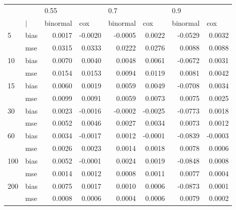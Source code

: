 \begin{table}[ht]
\centering
\begin{tabular}{ll rrrrrr}
  \toprule
     &            & \multicolumn{1}{l}{     0.55} & \multicolumn{1}{l}{        } & \multicolumn{1}{l}{      0.7} & \multicolumn{1}{l}{        } & \multicolumn{1}{l}{      0.9} & \multicolumn{1}{l}{        } \\ 
      &  $\vert$  & \multicolumn{1}{l}{ binormal} & \multicolumn{1}{l}{     cox} & \multicolumn{1}{l}{ binormal} & \multicolumn{1}{l}{     cox} & \multicolumn{1}{l}{ binormal} & \multicolumn{1}{l}{     cox} \\ 
   \midrule
5   & bias       &   0.0017 & -0.0020 &  -0.0005 &  0.0022 &  -0.0529 &  0.0032 \\ 
      & mse        &   0.0315 &  0.0333 &   0.0222 &  0.0276 &   0.0088 &  0.0088 \\ 
  10  & bias       &   0.0070 &  0.0040 &   0.0048 &  0.0061 &  -0.0672 &  0.0031 \\ 
      & mse        &   0.0154 &  0.0153 &   0.0094 &  0.0119 &   0.0081 &  0.0042 \\ 
  15  & bias       &   0.0060 &  0.0019 &   0.0059 &  0.0049 &  -0.0708 &  0.0034 \\ 
      & mse        &   0.0099 &  0.0091 &   0.0059 &  0.0073 &   0.0075 &  0.0025 \\ 
  30  & bias       &   0.0023 & -0.0016 &  -0.0002 & -0.0025 &  -0.0773 &  0.0018 \\ 
      & mse        &   0.0052 &  0.0046 &   0.0027 &  0.0034 &   0.0073 &  0.0012 \\ 
  60  & bias       &   0.0034 & -0.0017 &   0.0012 & -0.0001 &  -0.0839 & -0.0003 \\ 
      & mse        &   0.0026 &  0.0023 &   0.0014 &  0.0018 &   0.0078 &  0.0006 \\ 
  100 & bias       &   0.0052 & -0.0001 &   0.0024 &  0.0019 &  -0.0848 &  0.0008 \\ 
      & mse        &   0.0014 &  0.0012 &   0.0008 &  0.0011 &   0.0077 &  0.0004 \\ 
  200 & bias       &   0.0075 &  0.0017 &   0.0010 &  0.0006 &  -0.0873 &  0.0001 \\ 
      & mse        &   0.0008 &  0.0006 &   0.0004 &  0.0006 &   0.0079 &  0.0002 \\ 
   \bottomrule
\end{tabular}
\end{table}
